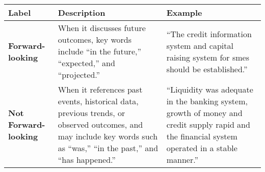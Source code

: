 \begin{table*}
    \caption{}
    \vspace{1em}
    \begin{tabular}{p{}p{}p{}}
    \toprule
    \textbf{Label} & \textbf{Description} & \textbf{Example}\\
    \midrule
    \textbf{Forward-looking} & When it discusses future outcomes, key words include “in the future,” “expected,” and “projected.” & ``The credit information system and capital raising system for smes should be established.''\\
    \midrule
    \textbf{Not Forward-looking} & When it references past events, historical data, previous trends, or observed outcomes, and may include key words such as “was,” “in the past,” and “has happened.” & ``Liquidity was adequate in the banking system, growth of money and credit supply rapid and the financial system operated in a stable manner.''\\
    \bottomrule
    \end{tabular}
    \label{tb:pboc_forward_looking_guide}
\end{table*}
    